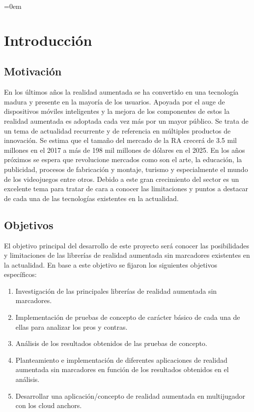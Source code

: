 \parindent=0em
\chapter*{Introducción}
\noindent
\section*{Motivación}
En los últimos años la realidad aumentada se ha convertido en una tecnología madura y presente en la mayoría de los usuarios. Apoyada por el auge de dispositivos móviles inteligentes y la mejora de los componentes de estos la realidad aumentada es adoptada cada vez más por un mayor público. Se trata de un tema de actualidad recurrente y de referencia en múltiples productos de innovación.\vspace{\baselineskip}
Se estima que el tamaño del mercado de la RA crecerá de 3.5 mil millones en el 2017 a más de 198 mil millones de dólares en el 2025.\cite{Statista} En los años próximos se espera que revolucione mercados como son el arte, la educación, la publicidad, procesos de fabricación y montaje, turismo y especialmente el mundo de los videojuegos entre otros. Debido a este gran crecimiento del sector es un excelente tema para tratar de cara a conocer las limitaciones y puntos a destacar de cada una de las tecnologías existentes en la actualidad.

\section*{Objetivos}
El objetivo principal del desarrollo de este proyecto será conocer las posibilidades y limitaciones de las librerías de realidad aumentada sin marcadores existentes en la actualidad. En base a este objetivo se fijaron los siguientes objetivos específicos:
\begin{enumerate}
\item Investigación de las principales librerías de realidad aumentada sin marcadores.
\item Implementación de pruebas de concepto de carácter básico de cada una de ellas para analizar los pros y contras.
\item Análisis de los resultados obtenidos de las pruebas de concepto.
\item Planteamiento e implementación de diferentes aplicaciones de realidad aumentada sin marcadores en función de los resultados obtenidos en el análisis.
\item Desarrollar una aplicación/concepto de realidad aumentada en multijugador con los cloud anchors.
\end{enumerate}

